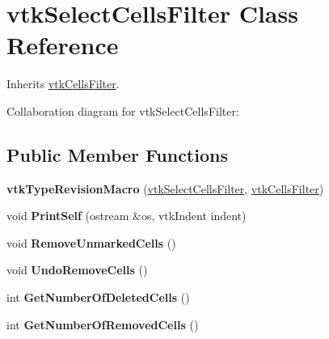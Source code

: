 \hypertarget{classvtkSelectCellsFilter}{
\section{vtkSelectCellsFilter Class Reference}
\label{classvtkSelectCellsFilter}
}


Inherits \hyperlink{classvtkCellsFilter}{vtkCellsFilter}.



Collaboration diagram for vtkSelectCellsFilter:\subsection*{Public Member Functions}
\begin{DoxyCompactItemize}
\item 
\hypertarget{classvtkSelectCellsFilter_a97afe8b94d0df57041a2ea955f5319d6}{
{\bfseries vtkTypeRevisionMacro} (\hyperlink{classvtkSelectCellsFilter}{vtkSelectCellsFilter}, \hyperlink{classvtkCellsFilter}{vtkCellsFilter})}
\label{classvtkSelectCellsFilter_a97afe8b94d0df57041a2ea955f5319d6}

\item 
\hypertarget{classvtkSelectCellsFilter_ab4dbfd9bd0ed3055e62096c9e70641e1}{
void {\bfseries PrintSelf} (ostream \&os, vtkIndent indent)}
\label{classvtkSelectCellsFilter_ab4dbfd9bd0ed3055e62096c9e70641e1}

\item 
\hypertarget{classvtkSelectCellsFilter_a6313ab4ca06976e9b704926477a5388a}{
void {\bfseries RemoveUnmarkedCells} ()}
\label{classvtkSelectCellsFilter_a6313ab4ca06976e9b704926477a5388a}

\item 
\hypertarget{classvtkSelectCellsFilter_aefabe7d7f0123f9a2f1cbdbc84e5fbb9}{
void {\bfseries UndoRemoveCells} ()}
\label{classvtkSelectCellsFilter_aefabe7d7f0123f9a2f1cbdbc84e5fbb9}

\item 
\hypertarget{classvtkSelectCellsFilter_af9a6cbce42557edea5fe202ea80e3a4c}{
int {\bfseries GetNumberOfDeletedCells} ()}
\label{classvtkSelectCellsFilter_af9a6cbce42557edea5fe202ea80e3a4c}

\item 
\hypertarget{classvtkSelectCellsFilter_ab5e77d61c73860f82968b9e361912895}{
int {\bfseries GetNumberOfRemovedCells} ()}
\label{classvtkSelectCellsFilter_ab5e77d61c73860f82968b9e361912895}

\end{DoxyCompactItemize}
